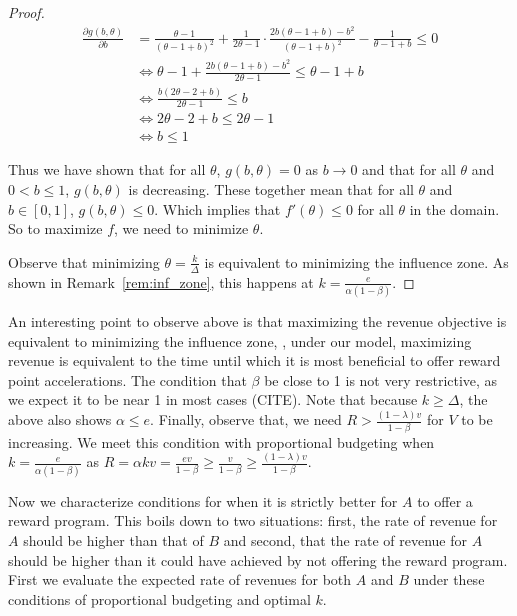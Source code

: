 \begin{proof}
\begin{align*}
\frac{\partial g(b,\theta)}{\partial b} &= \frac{\theta-1}{(\theta-1+b)^2}+\frac{1}{2\theta-1}\cdot \frac{2b(\theta-1+b)-b^2}{(\theta-1+b)^2} -\frac{1}{\theta-1+b} \leq 0 \\
&\iff \theta-1 + \frac{2b(\theta-1+b)-b^2}{2\theta-1} \leq \theta-1+b \\
&\iff \frac{b(2\theta-2+b)}{2\theta-1} \leq b \\
&\iff 2\theta-2+b \leq 2\theta-1 \\
&\iff b \leq 1
\end{align*}

Thus we have shown that for all $\theta$, $g(b,\theta) = 0$ as $b \to 0$ and that for all $\theta$ and $0 < b \leq 1$, $g(b,\theta)$ is decreasing. 
These together mean that for all $\theta$ and $b \in [0,1]$, $g(b,\theta) \leq 0$. 
Which implies that $f'(\theta) \le 0$ for all $\theta$ in the domain.
So to maximize $f$, we need to minimize $\theta$.

Observe that minimizing $\theta = \frac{k}{\Delta}$ is equivalent to minimizing the influence zone.
As shown in Remark~\ref{rem:inf_zone}, this happens at $k = \frac{e}{\alpha(1-\beta)}$. 
\end{proof}

An interesting point to observe above is that maximizing the revenue objective is equivalent to minimizing the influence zone, \ie, under our model, maximizing revenue is equivalent to the time until which it is most beneficial to offer reward point accelerations. 
The condition that $\beta$ be close to 1 is not very restrictive, as we expect it to be near 1 in most cases (CITE). Note that because $k \geq \Delta$, the above also shows $\alpha \leq e$. 
Finally, observe that, we need $R > \frac{(1-\lambda)v}{1-\beta}$ for $V$ to be increasing. 
We meet this condition with proportional budgeting when $k = \frac{e}{\alpha(1-\beta)}$ as $R = \alpha k v = \frac{e v}{1-\beta} \geq \frac{v}{1-\beta} \geq \frac{(1-\lambda)v}{1-\beta}$. 

Now we characterize conditions for when it is strictly better for $A$ to offer a reward program.
This boils down to two situations: first, the rate of revenue for $A$ should be higher than that of $B$ and second, that the rate of revenue for $A$ should be higher than it could have achieved by not offering the reward program.
First we evaluate the expected rate of revenues for both $A$ and $B$ under these conditions of proportional budgeting and optimal $k$.

